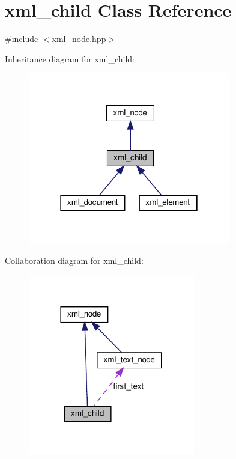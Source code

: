 \hypertarget{classxml__child}{}\section{xml\+\_\+child Class Reference}
\label{classxml__child}


{\ttfamily \#include $<$xml\+\_\+node.\+hpp$>$}



Inheritance diagram for xml\+\_\+child\+:
\nopagebreak
\begin{figure}[H]
\begin{center}
\leavevmode
\includegraphics[width=250pt]{da/db9/classxml__child__inherit__graph}
\end{center}
\end{figure}


Collaboration diagram for xml\+\_\+child\+:
\nopagebreak
\begin{figure}[H]
\begin{center}
\leavevmode
\includegraphics[width=206pt]{d7/d8e/classxml__child__coll__graph}
\end{center}
\end{figure}
